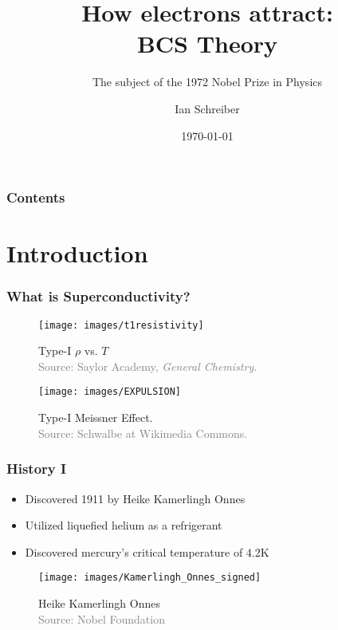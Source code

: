 \documentclass{beamer}
\title{How e\hspace{-1.5pt}lectrons attract:\\\vspace{3pt}BCS Theory}
\subtitle{The subject of the 1972 Nobel Prize in Physics}
\author{Ian Schreiber}
\date{\today}
\begin{document}
	\setcounter{showProgressBar}{0}
	\setcounter{showSlideNumbers}{0}
	\frame{\titlepage}

	\begin{frame}
		\frametitle{Contents}
		\tableofcontents
	\end{frame}

	\setcounter{framenumber}{0}
	\setcounter{showProgressBar}{1}
	\setcounter{showSlideNumbers}{1}
	\section{Introduction}
		\begin{frame}
			\frametitle{What is Superconductivity?}
			\begin{multicols}{2}
				\begin{figure}
					\centering
					\texttt{[image: images/t1resistivity]}
					\caption{Type-I $ \rho $ vs. $ T $ \\ \tiny \textcolor{gray}{Source: Saylor Academy, \textit{General Chemistry.}}}
					\label{fig:t1resistivity}
				\end{figure}
				\columnbreak
				\begin{figure}
					\centering
					\texttt{[image: images/EXPULSION]}
					\caption{Type-I Meissner Effect. \\ \tiny \textcolor{gray}{Source: Schwalbe at Wikimedia Commons.} }
					\label{fig:expulsion}
				\end{figure}
			\end{multicols}
			
		\end{frame}
		\begin{frame}
			\frametitle{History I}
			\begin{multicols}{2}
				\begin{itemize}
					\item Discovered 1911 by Heike Kamerlingh Onnes
					\item Utilized liquefied helium as a refrigerant
					\item Discovered mercury's critical temperature of 4.2K
				\end{itemize}
				\columnbreak
				\begin{figure}
					\centering
					\texttt{[image: images/Kamerlingh\_Onnes\_signed]}
					\caption{Heike Kamerlingh Onnes \\ \tiny \textcolor{gray}{Source: Nobel Foundation}}
					\label{fig:kamerlinghonnessigned}
				\end{figure}
			\end{multicols}
		\end{frame}
\end{document}
